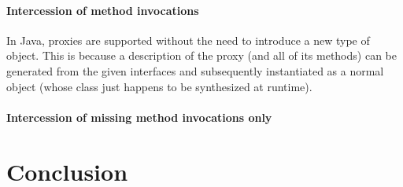 \documentclass{acm_proc_article-sp}
\begin{document}
\paragraph{Intercession of method invocations}

In Java, proxies are supported without the need to introduce a new type of object. This is because a description of the proxy (and all of its methods) can be generated from the given interfaces and subsequently instantiated as a normal object (whose class just happens to be synthesized at runtime).



\paragraph{Intercession of missing method invocations only}




\section{Conclusion}



\end{document}
